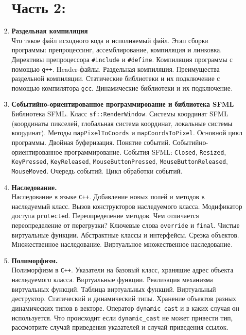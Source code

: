 \documentclass{article}
\begin{document}
\begin{enumerate}
\newpage
\section*{Часть 2:}

\item \textbf{Раздельная компиляция}\\
Что такое файл исходного кода и исполняемый файл. Этап сборки программы: препроцессинг, ассемблирование, компиляция и линковка. Директивы препроцессора \texttt{\#include} и \texttt{\#define}. Компиляция программы с помощью \texttt{g++}. Header-файлы. Раздельная компиляция. Преимущества раздельной компиляции. Статические библиотеки и их подключение с помощью компилятора \texttt{gcc}. Динамические библиотеки и их подключение.

\item \textbf{Событийно-ориентированное программирование и библиотека SFML}\\
Библиотека SFML. Класс \texttt{sf::RenderWindow}. Системы координат SFML (координаты пикселей, глобальная система координат, локальные системы координат). Методы \texttt{mapPixelToCoords} и \texttt{mapCoordsToPixel}. Основной цикл программы. Двойная буферизация. Понятие событий. Событийно-ориентированное программирование. События SFML: \texttt{Closed}, \texttt{Resized}, \texttt{KeyPressed}, \texttt{KeyReleased}, \texttt{MouseButtonPressed},  \texttt{MouseButtonReleased}, \texttt{MouseMoved}. Очередь событий. Цикл обработки событий.


\item \textbf{Наследование.}\\
Наследование в языке \texttt{C++}. Добавление новых полей и методов в наследуемый класс. Вызов конструкторов наследуемого класса. Модификатор доступа \texttt{protected}. Переопределение методов. Чем отличается переопределение от перегрузки? Ключевые слова \texttt{override} и \texttt{final}. Чистые виртуальные функции. Абстрактные классы и интерфейсы.  Срезка объектов. Множественное наследование. Виртуальное множественное наследование.

\item \textbf{Полиморфизм.}\\
Полиморфизм в \texttt{C++}. Указатели на базовый класс, хранящие адрес объекта наследуемого класса.  Виртуальные функции. Реализация механизма виртуальных функций. Таблица виртуальных функций. Виртуальный деструктор. Статический и динамический типы. Хранение объектов разных динамических типов в векторе. Оператор \texttt{dynamic\_cast} и в каких случая он используется. Что происходит если \texttt{dynamic\_cast} не может привести тип, рассмотрите случай приведения указателей и случай приведения ссылок.


\end{enumerate}
\end{document}
